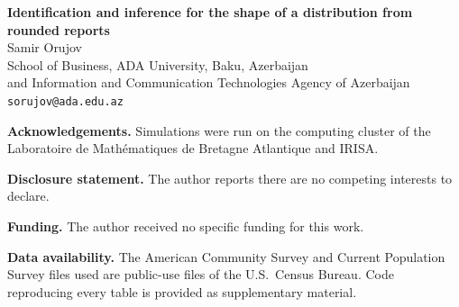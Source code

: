 \documentclass[12pt]{article}
\begin{document}
\begin{center}
{\large\bfseries Identification and inference for the shape of a distribution from rounded reports}\\[2em]
Samir Orujov\\
School of Business, ADA University, Baku, Azerbaijan\\
and Information and Communication Technologies Agency of Azerbaijan\\
\texttt{sorujov@ada.edu.az}
\end{center}
\bigskip
\noindent\textbf{Acknowledgements.} Simulations were run on the computing cluster of the Laboratoire de Math\'ematiques de Bretagne Atlantique and IRISA.

\noindent\textbf{Disclosure statement.} The author reports there are no competing interests to declare.


\noindent\textbf{Funding.} The author received no specific funding for this work.

\noindent\textbf{Data availability.} The American Community Survey and Current Population Survey files used are public-use files of the U.S.\ Census Bureau. Code reproducing every table is provided as supplementary material.
\end{document}
